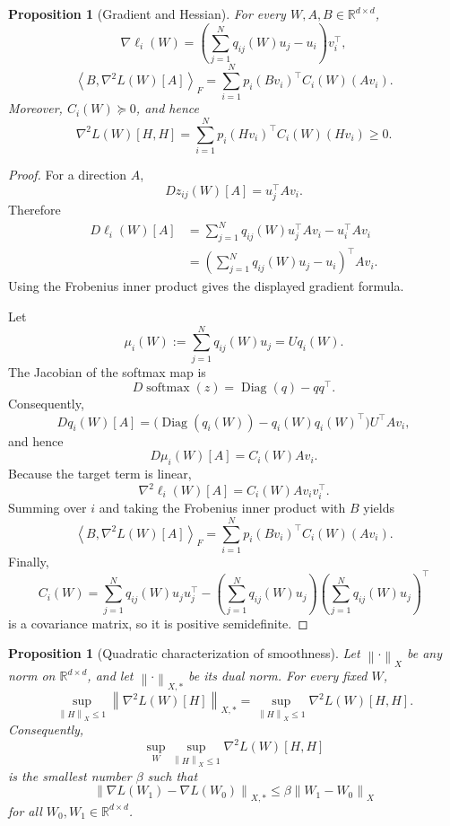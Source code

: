 \documentclass[11pt]{article}
\newtheorem{proposition}[theorem]{Proposition}
\newcommand{\R}{\mathbb{R}}
\newcommand{\1}{\mathbf{1}}
\newcommand{\Diag}{\operatorname{Diag}}
\newcommand{\softmax}{\operatorname{softmax}}
\newcommand{\ip}[2]{\left\langle #1,#2\right\rangle_F}
\newcommand{\norm}[1]{\left\|#1\right\|}
\begin{document}
\begin{proposition}[Gradient and Hessian]
\label{prop:hessian}
For every \(W,A,B\in\R^{d\times d}\),
\[
 \nabla \ell_i(W)
 =
 \left(\sum_{j=1}^N q_{ij}(W)u_j-u_i\right)v_i^\top,
\]
\[
 \ip{B}{\nabla^2L(W)[A]}
 =
 \sum_{i=1}^N p_i(Bv_i)^\top C_i(W)(Av_i).
\]
Moreover, \(C_i(W)\succeq 0\), and hence
\[
 \boxed{
 \nabla^2L(W)[H,H]
 =
 \sum_{i=1}^N p_i(Hv_i)^\top C_i(W)(Hv_i)
 \ge 0.
 }
\]
\end{proposition}

\begin{proof}
For a direction \(A\),
\[
 Dz_{ij}(W)[A]=u_j^\top Av_i.
\]
Therefore
\begin{align*}
 D\ell_i(W)[A]
 &=
 \sum_{j=1}^N q_{ij}(W)u_j^\top Av_i-u_i^\top Av_i\\
 &=
 \left(\sum_{j=1}^N q_{ij}(W)u_j-u_i\right)^\top Av_i.
\end{align*}
Using the Frobenius inner product gives the displayed gradient formula.

Let
\[
 \mu_i(W):=\sum_{j=1}^N q_{ij}(W)u_j=Uq_i(W).
\]
The Jacobian of the softmax map is
\[
 D\softmax(z)=\Diag(q)-qq^\top.
\]
Consequently,
\[
 Dq_i(W)[A]
 =
 \bigl(\Diag(q_i(W))-q_i(W)q_i(W)^\top\bigr)U^\top Av_i,
\]
and hence
\[
 D\mu_i(W)[A]=C_i(W)Av_i.
\]
Because the target term is linear,
\[
 \nabla^2\ell_i(W)[A]=C_i(W)Av_iv_i^\top.
\]
Summing over \(i\) and taking the Frobenius inner product with \(B\) yields
\[
 \ip{B}{\nabla^2L(W)[A]}
 =
 \sum_{i=1}^N p_i(Bv_i)^\top C_i(W)(Av_i).
\]
Finally,
\[
 C_i(W)
 =
 \sum_{j=1}^N q_{ij}(W)u_ju_j^\top
 -\left(\sum_{j=1}^N q_{ij}(W)u_j\right)
  \left(\sum_{j=1}^N q_{ij}(W)u_j\right)^\top
\]
is a covariance matrix, so it is positive semidefinite.
\end{proof}

\begin{proposition}[Quadratic characterization of smoothness]
\label{prop:quadratic-characterization}
Let \(\norm{\cdot}_X\) be any norm on \(\R^{d\times d}\), and let
\(\norm{\cdot}_{X,*}\) be its dual norm.  For every fixed \(W\),
\[
 \sup_{\norm{H}_X\le 1}
 \norm{\nabla^2L(W)[H]}_{X,*}
 =
 \sup_{\norm{H}_X\le 1}
 \nabla^2L(W)[H,H].
\]
Consequently,
\[
 \sup_W\sup_{\norm{H}_X\le 1}
 \nabla^2L(W)[H,H]
\]
is the smallest number \(\beta\) such that
\[
 \norm{\nabla L(W_1)-\nabla L(W_0)}_{X,*}
 \le
 \beta\norm{W_1-W_0}_X
\]
for all \(W_0,W_1\in\R^{d\times d}\).
\end{proposition}
\end{document}
